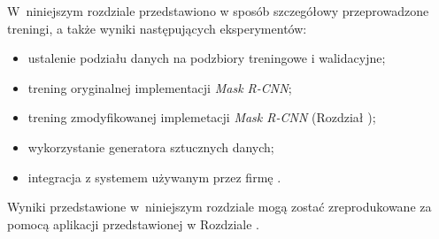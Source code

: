 
W~niniejszym rozdziale przedstawiono w sposób szczegółowy przeprowadzone treningi, a także wyniki następujących eksperymentów:

\begin{itemize}
 \item ustalenie podziału danych na podzbiory treningowe i walidacyjne;
 \item trening oryginalnej implementacji \textit{Mask R-CNN};
 \item trening zmodyfikowanej implemetacji \textit{Mask R-CNN} (Rozdział );
 \item wykorzystanie generatora sztucznych danych;
 \item integracja z systemem używanym przez firmę \blue{}.
\end{itemize}

Wyniki przedstawione w~niniejszym rozdziale mogą zostać zreprodukowane za pomocą aplikacji przedstawionej w Rozdziale .
